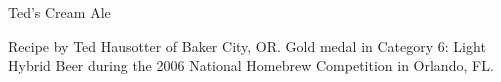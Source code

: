 \begin{recipe}{Ted's Cream Ale} %

\begin{aboutblock}
Recipe by Ted Hausotter of Baker City, OR. Gold medal in Category 6: Light
Hybrid Beer during the 2006 National Homebrew Competition in Orlando, FL.
\sourceaha
\end{aboutblock}


\begin{methodandtiming}

\begin{mashsteps}
\end{mashsteps}

\begin{fermentationsteps}
\end{fermentationsteps}

\end{methodandtiming}

\recipebreak

\begin{ingredientsblock}

\begin{malts}
\end{malts}

\begin{hops}
\end{hops}


\end{ingredientsblock}

\end{recipe}
